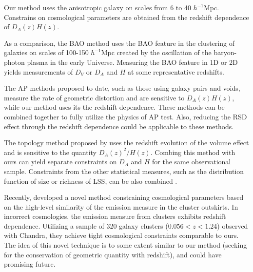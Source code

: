 \documentclass[iop]{emulateapj}
\begin{document}
Our method uses the anisotropic galaxy on scales from 6 to 40 $h^{-1}$Mpc.
Constrains on cosmological parameters are obtained from the redshift dependence of $D_A(z) H(z)$.

As a comparison, the BAO method uses the BAO feature in the 
clustering of galaxies on scales of 100-150 $h^{-1}$Mpc 
created by the oscillation of the baryon-photon plasma in the early Universe.
Measuring the BAO feature in 1D or 2D yields measurements of $D_V$ or $D_A$ and $H$ at some representative redshifts.

The AP methods proposed to date, such as those using 
galaxy pairs and voids, measure the rate of geometric distortion and are sensitive to $D_A(z) H(z)$,
while our method uses its the redshift dependence.
These methods can be combined together to fully utilize the physics of AP test.
Also, reducing the RSD effect 
through the redshift dependence could be 
applicable to these methods.

The topology method proposed by \cite{topology} 
uses the redshift evolution of the volume effect and is sensitive to the quantity $D_A(z)^2 / H(z)$.
Combing this method with ours can yield separate constraints on $D_A$ and $H$ 
for the same observational sample.
Constraints from the other statistical measures,
such as the distribution function of size or richness of LSS,
can be also combined \citep{Park2012,Park2015}.

Recently, \cite{MS2016} developed a novel method 
constraining cosmological parameters based on the high-level similarity of the emission measure in the cluster outskirts.
In incorrect cosmologies, the emission measure from clusters exhibits redshift dependence.
Utilizing a sample of 320 galaxy clusters ($0.056<z<1.24$) observed with Chandra,
they achieve tight cosmological constraints comparable to ours.
The idea of this novel technique is to some extent similar to our method 
(seeking for the conservation of geometric quantity with redshift),
and could have promising future.
\end{document}

